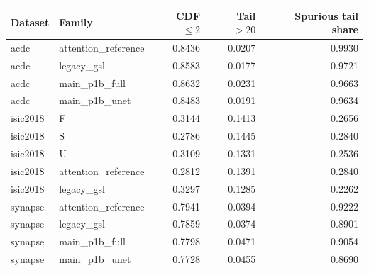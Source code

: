\begin{tabular}{llrrr}
Dataset & Family & CDF $\leq2$ & Tail $>20$ & Spurious tail share \\
\hline
acdc & attention\_reference & 0.8436 & 0.0207 & 0.9930 \\
acdc & legacy\_gsl & 0.8583 & 0.0177 & 0.9721 \\
acdc & main\_p1b\_full & 0.8632 & 0.0231 & 0.9663 \\
acdc & main\_p1b\_unet & 0.8483 & 0.0191 & 0.9634 \\
isic2018 & F & 0.3144 & 0.1413 & 0.2656 \\
isic2018 & S & 0.2786 & 0.1445 & 0.2840 \\
isic2018 & U & 0.3109 & 0.1331 & 0.2536 \\
isic2018 & attention\_reference & 0.2812 & 0.1391 & 0.2840 \\
isic2018 & legacy\_gsl & 0.3297 & 0.1285 & 0.2262 \\
synapse & attention\_reference & 0.7941 & 0.0394 & 0.9222 \\
synapse & legacy\_gsl & 0.7859 & 0.0374 & 0.8901 \\
synapse & main\_p1b\_full & 0.7798 & 0.0471 & 0.9054 \\
synapse & main\_p1b\_unet & 0.7728 & 0.0455 & 0.8690 \\
\end{tabular}
